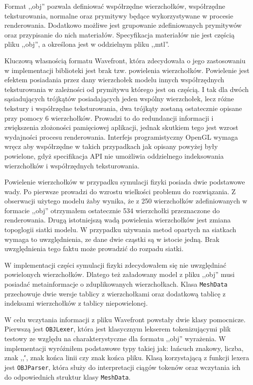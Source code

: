 {Format ,,obj'' pozwala definiować współrzędne wierzchołków,
współrzędne teksturowania, normalne oraz prymitywy będące wykorzystywane w
procesie renderowania. Dodatkowo możliwe jest grupowanie zdefiniowanych
prymitywów oraz przypisanie do nich materiałów. Specyfikacja materiałów nie
jest częścią pliku ,,obj'', a określona jest w oddzielnym pliku ,,mtl''.

Kluczową własnością formatu Wavefront, która zdecydowała o jego zastosowaniu w
implementacji biblioteki jest brak tzw. powielenia wierzchołków.
Powielenie jest efektem posiadania przez dany wierzchołek modelu
innych współrzędnych teksturowania w zależności od prymitywu którego jest on
częścią. I tak dla dwóch sąsiadujących trójkątów posiadających jeden wspólny
wierzchołek, lecz różne tekstury i
współrzędne teksturowania, dwa trójkąty zostaną ostatecznie opisane przy pomocy 6
wierzchołków. Prowadzi to do redundancji informacji i zwiększenia złożoności
pamięciowej aplikacji, jednak skutkiem tego jest wzrost wydajności procesu
renderowania. Interfejs programistyczny OpenGL wymaga wręcz aby współrzędne w
takich przypadkach jak opisany powyżej były powielone, gdyż specifikacja API nie umożliwia
oddzielnego indeksowania wierzchołków i współrzędnych teksturowania.

Powielenie wierzchołków w przypadku symulacji fizyki posiada dwie podstawowe wady. Po
pierwsze prowadzi do wzrostu wielkości problemu do rozwiązania. Z
obserwacji użytego modelu żaby wynika, że z 250 wierzchołków zdefiniowanych w
formacie ,,obj'' otrzymałem ostatecznie 534 wierzchołki przeznaczone do
renderowania. Drugą istotniejszą wadą powielenia wierzchołków jest zmiana
topoglogii siatki modelu. W przypadku używania metod opartych na siatkach wymaga
to uwzględnienia, ze dane dwie cząstki są w istocie jedną. Brak uwzględnienia
tego faktu może prowadzić do rozpadu siatki.

W implementacji części symulacji fizyki zdecydowałem się nie uwzględniać
powielonych wierzchołków. Dlatego też załadowany model z pliku ,,obj'' musi
posiadać metainformacje o zduplikowanych wierzchołkach. Klasa \texttt{MeshData}
przechowuje dwie wersje tablicy z wierzchołkami oraz dodatkową tablicę
z indeksami wierzchołków z tablicy niepowielonej.

W celu wczytania informacji z pliku Wavefront powstały dwie klasy pomocnicze.
Pierwszą jest \texttt{OBJLexer}, która jest klasycznym lekserem tokenizującymi
plik testowy ze względu na charakterystyczne dla formatu ,,obj'' wyrażenia. W
implementacji wyróżniłem podstawowe typy takiej jak: łańcuch znakowy, liczba,
znak ,,\'', znak końca linii czy znak końca pliku. Klasą korzystającą z funkcji
	lexera jest \texttt{OBJParser}, która służy do interpretacji ciągów tokenów
	oraz wczytania ich do odpowiednich struktur klasy \texttt{MeshData}.

}
